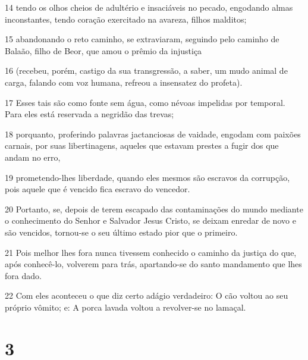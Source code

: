 \par 14 tendo os olhos cheios de adultério e insaciáveis no pecado, engodando almas inconstantes, tendo coração exercitado na avareza, filhos malditos;
\par 15 abandonando o reto caminho, se extraviaram, seguindo pelo caminho de Balaão, filho de Beor, que amou o prêmio da injustiça
\par 16 (recebeu, porém, castigo da sua transgressão, a saber, um mudo animal de carga, falando com voz humana, refreou a insensatez do profeta).
\par 17 Esses tais são como fonte sem água, como névoas impelidas por temporal. Para eles está reservada a negridão das trevas;
\par 18 porquanto, proferindo palavras jactanciosas de vaidade, engodam com paixões carnais, por suas libertinagens, aqueles que estavam prestes a fugir dos que andam no erro,
\par 19 prometendo-lhes liberdade, quando eles mesmos são escravos da corrupção, pois aquele que é vencido fica escravo do vencedor.
\par 20 Portanto, se, depois de terem escapado das contaminações do mundo mediante o conhecimento do Senhor e Salvador Jesus Cristo, se deixam enredar de novo e são vencidos, tornou-se o seu último estado pior que o primeiro.
\par 21 Pois melhor lhes fora nunca tivessem conhecido o caminho da justiça do que, após conhecê-lo, volverem para trás, apartando-se do santo mandamento que lhes fora dado.
\par 22 Com eles aconteceu o que diz certo adágio verdadeiro: O cão voltou ao seu próprio vômito; e: A porca lavada voltou a revolver-se no lamaçal.

\chapter{3}


